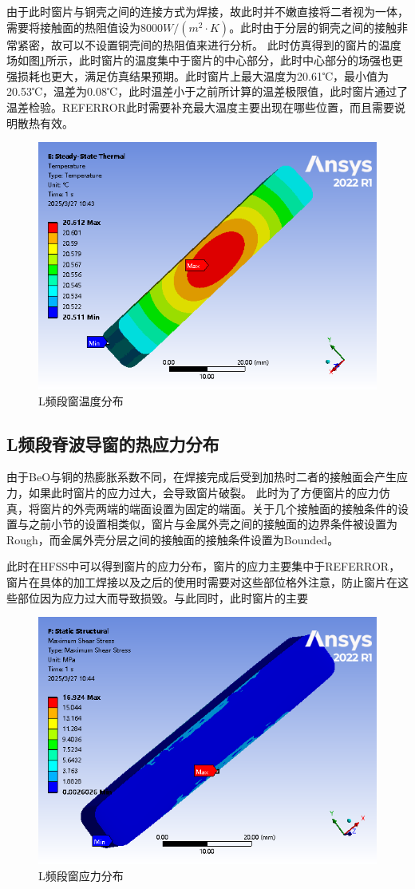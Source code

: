 \documentclass[master]{thesis-uestc}
\begin{document}
由于此时窗片与铜壳之间的连接方式为焊接，故此时并不嫩直接将二者视为一体，需要将接触面的热阻值设为8000\(W / (m^2 \cdot K)\)。此时由于分层的铜壳之间的接触非常紧密，故可以不设置铜壳间的热阻值来进行分析。
此时仿真得到的窗片的温度场如图\ref{fig:L频段窗温度分布}所示，此时窗片的温度集中于窗片的中心部分，此时中心部分的场强也更强损耗也更大，满足仿真结果预期。此时窗片上最大温度为20.61℃，最小值为20.53℃，温差为0.08℃，此时温差小于之前所计算的温差极限值，此时窗片通过了温差检验。REFERROR此时需要补充最大温度主要出现在哪些位置，而且需要说明散热有效。
\begin{figure}[!htb]
    \centering
    \includegraphics[width=0.35\linewidth]{pic/chapter4/L频段窗温度分布.png}
    \caption{L频段窗温度分布}
    \label{fig:L频段窗温度分布}
\end{figure}

\subsection{L频段脊波导窗的热应力分布}
由于BeO与铜的热膨胀系数不同，在焊接完成后受到加热时二者的接触面会产生应力，如果此时窗片的应力过大，会导致窗片破裂。
此时为了方便窗片的应力仿真，将窗片的外壳两端的端面设置为固定的端面。关于几个接触面的接触条件的设置与之前小节的设置相类似，窗片与金属外壳之间的接触面的边界条件被设置为Rough，而金属外壳分层之间的接触面的接触条件设置为Bounded。

此时在HFSS中可以得到窗片的应力分布，窗片的应力主要集中于REFERROR，窗片在具体的加工焊接以及之后的使用时需要对这些部位格外注意，防止窗片在这些部位因为应力过大而导致损毁。与此同时，此时窗片的主要
\begin{figure}[!htb]
    \centering
    \includegraphics[width=0.35\linewidth]{pic/chapter4/L频段窗应力.png}
    \caption{L频段窗应力分布}
    \label{fig:L频段窗应力分布}
\end{figure}
\end{document}
